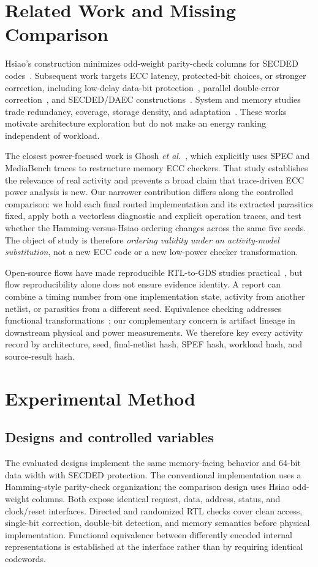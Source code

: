 \documentclass[conference,10pt]{IEEEtran}
\begin{document}
\section{Related Work and Missing Comparison}
Hsiao's construction minimizes odd-weight parity-check columns for SECDED codes~\cite{hsiao1970}. Subsequent work targets ECC latency, protected-bit choices, or stronger correction, including low-delay data-bit protection~\cite{reviriego2013}, parallel double-error correction~\cite{naseer2008}, and SECDED/DAEC constructions~\cite{tripathi2020}. System and memory studies trade redundancy, coverage, storage density, and adaptation~\cite{delbel2014,pajouhi2015,wei2020,lee2022}. These works motivate architecture exploration but do not make an energy ranking independent of workload.

The closest power-focused work is Ghosh \emph{et al.}~\cite{ghosh2004}, which explicitly uses SPEC and MediaBench traces to restructure memory ECC checkers. That study establishes the relevance of real activity and prevents a broad claim that trace-driven ECC power analysis is new. Our narrower contribution differs along the controlled comparison: we hold each final routed implementation and its extracted parasitics fixed, apply both a vectorless diagnostic and explicit operation traces, and test whether the Hamming-versus-Hsiao ordering changes across the same five seeds. The object of study is therefore \emph{ordering validity under an activity-model substitution}, not a new ECC code or a new low-power checker transformation.

Open-source flows have made reproducible RTL-to-GDS studies practical~\cite{ajayi2019,shalan2020}, but flow reproducibility alone does not ensure evidence identity. A report can combine a timing number from one implementation state, activity from another netlist, or parasitics from a different seed. Equivalence checking addresses functional transformations~\cite{kuehlmann1997,kuehlmann2002}; our complementary concern is artifact lineage in downstream physical and power measurements. We therefore key every activity record by architecture, seed, final-netlist hash, SPEF hash, workload hash, and source-result hash.

\section{Experimental Method}
\subsection{Designs and controlled variables}
The evaluated designs implement the same memory-facing behavior and 64-bit data width with SECDED protection. The conventional implementation uses a Hamming-style parity-check organization; the comparison design uses Hsiao odd-weight columns. Both expose identical request, data, address, status, and clock/reset interfaces. Directed and randomized RTL checks cover clean access, single-bit correction, double-bit detection, and memory semantics before physical implementation. Functional equivalence between differently encoded internal representations is established at the interface rather than by requiring identical codewords.
\end{document}
